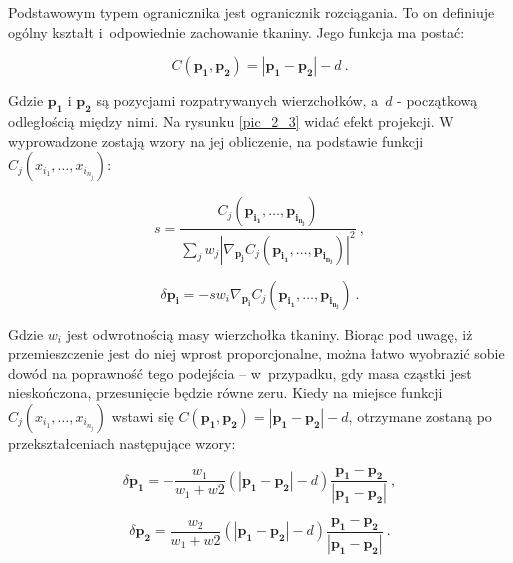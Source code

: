 			
			Podstawowym typem ogranicznika jest ogranicznik rozciągania. To on definiuje ogólny kształt i~odpowiednie zachowanie tkaniny. Jego funkcja ma postać:
			
			\begin{equation}
			C(\mathbf{p_{1}}, \mathbf{p_{2}}) = |\mathbf{p_{1}} - \mathbf{p_{2}}| - d \ .		
			\end{equation}
			
			Gdzie \( \mathbf{p_{1}} \) i \( \mathbf{p_{2}} \) są pozycjami rozpatrywanych wierzchołków, a~\(d\) - początkową odległością między nimi. Na rysunku \ref{pic_2_3} widać efekt projekcji. W~\cite{posbased} wyprowadzone zostają wzory na jej obliczenie, na podstawie funkcji \( C_{j}(x_{i_{1}}, \dots, x_{i_{n_{j}}} ) \):
			
			\begin{equation}
			s = \frac{C_{j}(\mathbf{p_{i_{1}}}, \dots, \mathbf{p_{i_{n_{j}}}} )}{ \sum _{j} w_{j} | \nabla _{\mathbf{p_{j}}} C_{j}(\mathbf{p_{i_{1}}}, \dots, \mathbf{p_{i_{n_{j}}}} ) | ^{2} } \ ,		
			\end{equation}
			
			\begin{equation}
			\delta \mathbf{p_{i}} = -sw_{i} \nabla _{\mathbf{p_{i}}} C_{j}(\mathbf{p_{i_{1}}}, \dots, \mathbf{p_{i_{n_{j}}}} ) \ .
			\end{equation}
			
			Gdzie \(w_{i}\) jest odwrotnością masy wierzchołka tkaniny. Biorąc pod uwagę, iż przemieszczenie jest do niej wprost proporcjonalne, można łatwo wyobrazić sobie dowód na poprawność tego podejścia -- w~przypadku, gdy masa cząstki jest nieskończona, przesunięcie będzie równe zeru. Kiedy na miejsce funkcji \(C_{j}(x_{i_{1}}, \dots, x_{i_{n_{j}}} ) \) wstawi się \(C(\mathbf{p_{1}}, \mathbf{p_{2}}) = |\mathbf{p_{1}} - \mathbf{p_{2}}| - d\), otrzymane zostaną po przekształceniach następujące wzory: 
			
			\begin{equation}
			\delta \mathbf{p_{1}} = - \frac{w_{1}}{w_{1} + w{2}} (|\mathbf{p_{1}} - \mathbf{p_{2}}| - d) \frac{\mathbf{p_{1}} - \mathbf{p_{2}}}{|\mathbf{p_{1}} - \mathbf{p_{2}}|} \ ,
			\end{equation}
			
			\begin{equation}
			\delta \mathbf{p_{2}} = \frac{w_{2}}{w_{1} + w{2}} (|\mathbf{p_{1}} - \mathbf{p_{2}}| - d) \frac{\mathbf{p_{1}} - \mathbf{p_{2}}}{|\mathbf{p_{1}} - \mathbf{p_{2}}|} \ .
			\end{equation}
			
